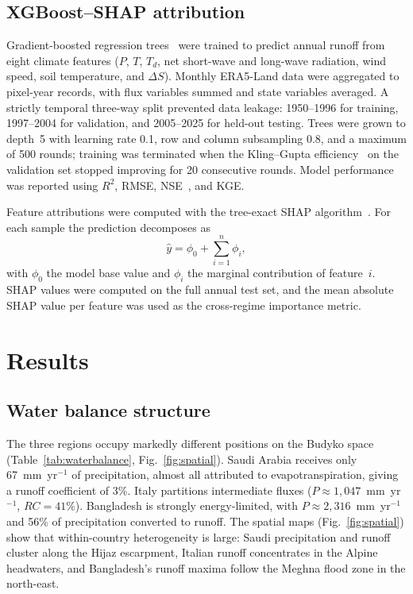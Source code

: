\documentclass[11pt]{article}
\begin{document}
\subsection{XGBoost--SHAP attribution}

Gradient-boosted regression trees~\cite{xgboost2016} were trained to predict annual runoff from eight climate features ($P$, $T$, $T_d$, net short-wave and long-wave radiation, wind speed, soil temperature, and $\Delta S$). Monthly ERA5-Land data were aggregated to pixel-year records, with flux variables summed and state variables averaged. A strictly temporal three-way split prevented data leakage: 1950--1996 for training, 1997--2004 for validation, and 2005--2025 for held-out testing. Trees were grown to depth~5 with learning rate 0.1, row and column subsampling 0.8, and a maximum of 500 rounds; training was terminated when the Kling--Gupta efficiency~\cite{gupta2009kge} on the validation set stopped improving for 20 consecutive rounds. Model performance was reported using $R^2$, RMSE, NSE~\cite{nash1970nse}, and KGE.

Feature attributions were computed with the tree-exact SHAP algorithm~\cite{lundberg2020shaptrees}. For each sample the prediction decomposes as
\begin{equation}
\hat{y} = \phi_0 + \sum_{i=1}^{n} \phi_i,
\end{equation}
with $\phi_0$ the model base value and $\phi_i$ the marginal contribution of feature~$i$. SHAP values were computed on the full annual test set, and the mean absolute SHAP value per feature was used as the cross-regime importance metric.

\section{Results}

\subsection{Water balance structure}

The three regions occupy markedly different positions on the Budyko space (Table~\ref{tab:waterbalance}, Fig.~\ref{fig:spatial}). Saudi Arabia receives only 67~mm~yr$^{-1}$ of precipitation, almost all attributed to evapotranspiration, giving a runoff coefficient of 3\%. Italy partitions intermediate fluxes ($P \approx 1{,}047$~mm~yr$^{-1}$, $RC = 41\%$). Bangladesh is strongly energy-limited, with $P \approx 2{,}316$~mm~yr$^{-1}$ and 56\% of precipitation converted to runoff. The spatial maps (Fig.~\ref{fig:spatial}) show that within-country heterogeneity is large: Saudi precipitation and runoff cluster along the Hijaz escarpment, Italian runoff concentrates in the Alpine headwaters, and Bangladesh's runoff maxima follow the Meghna flood zone in the north-east.
\end{document}
